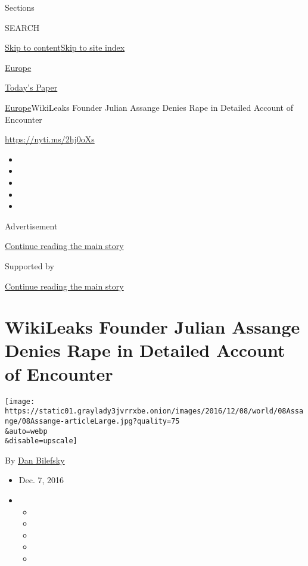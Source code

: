 Sections

SEARCH

\protect\hyperlink{site-content}{Skip to
content}\protect\hyperlink{site-index}{Skip to site index}

\href{https://www.nytimes3xbfgragh.onion/section/world/europe}{Europe}

\href{https://myaccount.nytimes3xbfgragh.onion/auth/login?response_type=cookie\&client_id=vi}{}

\href{https://www.nytimes3xbfgragh.onion/section/todayspaper}{Today's
Paper}

\href{/section/world/europe}{Europe}\textbar{}WikiLeaks Founder Julian
Assange Denies Rape in Detailed Account of Encounter

\url{https://nyti.ms/2hj0oXs}

\begin{itemize}
\item
\item
\item
\item
\item
\end{itemize}

Advertisement

\protect\hyperlink{after-top}{Continue reading the main story}

Supported by

\protect\hyperlink{after-sponsor}{Continue reading the main story}

\hypertarget{wikileaks-founder-julian-assange-denies-rape-in-detailed-account-of-encounter}{%
\section{WikiLeaks Founder Julian Assange Denies Rape in Detailed
Account of
Encounter}\label{wikileaks-founder-julian-assange-denies-rape-in-detailed-account-of-encounter}}

\texttt{[image: https://static01.graylady3jvrrxbe.onion/images/2016/12/08/world/08Assange/08Assange-articleLarge.jpg?quality=75\\\&auto=webp\\\&disable=upscale]}

By \href{http://www.nytimes3xbfgragh.onion/by/dan-bilefsky}{Dan
Bilefsky}

\begin{itemize}
\item
  Dec. 7, 2016
\item
  \begin{itemize}
  \item
  \item
  \item
  \item
  \item
  \end{itemize}
\end{itemize}

